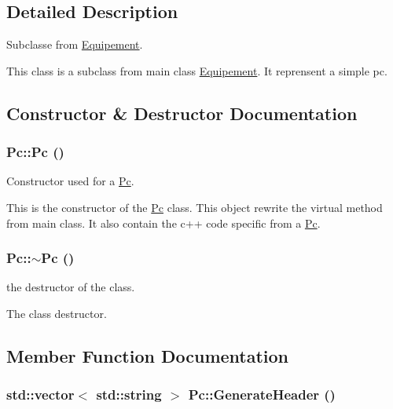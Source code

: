 \subsection{Detailed Description}
Subclasse from \hyperlink{class_equipement}{Equipement}. 

This class is a subclass from main class \hyperlink{class_equipement}{Equipement}. It reprensent a simple pc. 

\subsection{Constructor \& Destructor Documentation}
\hypertarget{class_pc_ef7314496cee3c1bd2c329aac4dc4f21}{
\subsubsection[{Pc}]{\setlength{\rightskip}{0pt plus 5cm}Pc::Pc ()}}
\label{class_pc_ef7314496cee3c1bd2c329aac4dc4f21}


Constructor used for a \hyperlink{class_pc}{Pc}. 

This is the constructor of the \hyperlink{class_pc}{Pc} class. This object rewrite the virtual method from main class. It also contain the c++ code specific from a \hyperlink{class_pc}{Pc}. \hypertarget{class_pc_b15cb9b9bfb8a9d9ff964091e1a63cec}{
\subsubsection[{$\sim$Pc}]{\setlength{\rightskip}{0pt plus 5cm}Pc::$\sim$Pc ()}}
\label{class_pc_b15cb9b9bfb8a9d9ff964091e1a63cec}


the destructor of the class. 

The class destructor. 

\subsection{Member Function Documentation}
\hypertarget{class_pc_ca543f3f579e2531dfbe70a8ae419915}{
\subsubsection[{GenerateHeader}]{\setlength{\rightskip}{0pt plus 5cm}std::vector$<$ std::string $>$ Pc::GenerateHeader ()}}
\label{class_pc_ca543f3f579e2531dfbe70a8ae419915}


